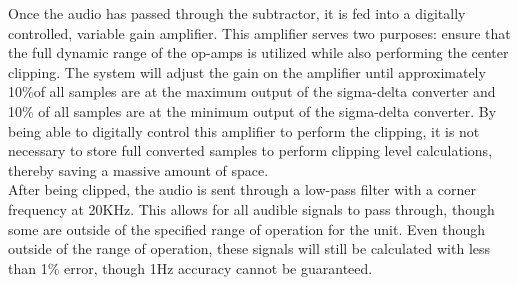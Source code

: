 \documentclass[aps,letterpaper,10pt]{revtex4}
\begin{document}
Once the audio has passed through the subtractor, it is fed into a digitally controlled, variable gain amplifier. This amplifier serves two purposes: ensure that the full dynamic range of the op-amps is utilized while also performing the center clipping. The system will adjust the gain on the amplifier until approximately 10\%of all samples are at the maximum output of the sigma-delta converter and 10\% of all samples are at the minimum output of the sigma-delta converter. By being able to digitally control this amplifier to perform the clipping, it is not necessary to store full converted samples to perform clipping level calculations, thereby saving a massive amount of space. \\

After being clipped, the audio is sent through a low-pass filter with a corner frequency at 20KHz. This allows for all audible signals to pass through, though some are outside of the specified range of operation for the unit. Even though outside of the range of operation, these signals will still be calculated with less than 1\% error, though 1Hz accuracy cannot be guaranteed. \\
\end{document}
